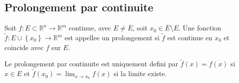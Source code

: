 \documentclass[../main.tex]{subfiles}
\begin{document}
\subsection{Prolongement par continuite}
\begin{defn}
	Soit $f: E\subset \mathbb{R}^n \to \mathbb{R}^m$ continue, avec $E \neq \overline{E}$, soit $x_0 \in \overline{E}\setminus E$. Une fonction $\tilde f: E\cup \left\{ x_0 \right\} \to \mathbb{R}^m$ est appellee un prolongement si
	$\tilde f$ est continue en $x_0$ et coincide avec $f$ sur $E$.
	
\end{defn}
Le prolongement par continuite est uniquement defini par 
$\tilde f (x) =f( x) $ si $x \in E$ et $\tilde f ( x_{0})= \lim_{x \to x_0} f( x)  $ si la limite existe.
\end{document}
